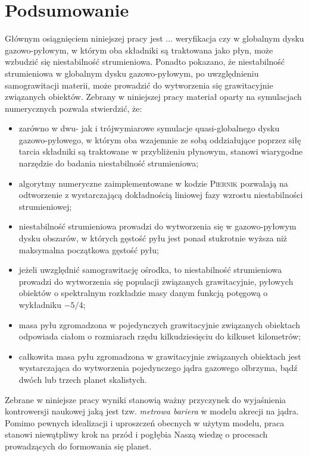 
\chapter{Podsumowanie}

Głównym osiągnięciem niniejszej pracy jest $\ldots$ weryfikacja czy w globalnym
dysku gazowo-pyłowym, w którym oba składniki są traktowana jako płyn, może
wzbudzić się niestabilność strumieniowa. Ponadto pokazano, że niestabilność
strumieniowa w globalnym dysku gazowo-pyłowym, po uwzględnieniu samograwitacji
materii, może prowadzić do wytworzenia się grawitacyjnie związanych obiektów.
Zebrany w niniejszej pracy materiał oparty na symulacjach numerycznych
pozwala stwierdzić, że:

\begin{itemize}
   \item zarówno w dwu- jak i trójwymiarowe symulacje quasi-globalnego dysku
      gazowo-pyłowego, w którym oba wzajemnie ze sobą oddziałujące poprzez siłę
      tarcia składniki są traktowane w przybliżeniu płynowym, stanowi wiarygodne
      narzędzie do badania niestabilność strumieniowa;
   \item algorytmy numeryczne zaimplementowane w kodzie \textsc{Piernik}
      pozwalają na odtworzenie z wystarczającą dokładnością liniowej fazy
      wzrostu niestabilności strumieniowej;
   \item niestabilność strumieniowa prowadzi do wytworzenia się w gazowo-pyłowym
      dysku obszarów, w których gęstość pyłu jest ponad stukrotnie wyższa niż
      maksymalna początkowa gęstość pyłu;
   \item jeżeli uwzględnić samograwitację ośrodka, to niestabilność strumieniowa
      prowadzi do wytworzenia się populacji związanych grawitacyjnie, pyłowych
      obiektów o spektralnym rozkładzie masy danym funkcją potęgową o wykładniku
      $-5/4$;
   \item masa pyłu zgromadzona w pojedynczych grawitacyjnie związanych obiektach
      odpowiada ciałom o rozmiarach rzędu kilkudziesięciu do kilkuset
      kilometrów;
   \item całkowita masa pyłu zgromadzona w grawitacyjnie związanych obiektach
      jest wystarczająca do wytworzenia pojedynczego jądra gazowego
      olbrzyma, bądź dwóch lub trzech planet skalistych.
\end{itemize}
Zebrane w niniejsze pracy wyniki stanowią ważny przyczynek do wyjaśnienia
kontrowersji naukowej jaką jest tzw. \emph{metrowa bariera} w modelu akrecji na
jądra. Pomimo pewnych idealizacji i uproszczeń obecnych w użytym modelu, praca
stanowi niewątpliwy krok na przód i pogłębia Naszą wiedzę o procesach
prowadzących do formowania się planet.

